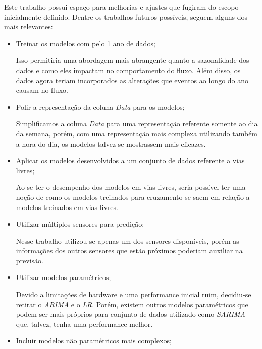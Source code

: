 Este trabalho possui espaço para melhorias e ajustes que fugiram do escopo inicialmente definido. Dentre os trabalhos futuros possíveis, seguem alguns dos mais relevantes:

\begin{itemize}
    \item Treinar os modelos com pelo 1 ano de dados;
    
    Isso permitiria uma abordagem mais abrangente quanto a sazonalidade dos dados e como eles impactam no comportamento do fluxo. Além disso, os dados agora teriam incorporados as alterações que eventos ao longo do ano causam no fluxo.
    
    \item Polir a representação da coluna  \textit{Data} para os modelos;
    
    Simplificamos a coluna \textit{Data} para uma representação referente somente ao dia da semana, porém, com uma representação mais complexa utilizando também a hora do dia, os modelos talvez se mostrassem mais eficazes.
    \item Aplicar os modelos desenvolvidos a um conjunto de dados referente a vias livres;
    
    Ao se ter o desempenho dos modelos em vias livres, seria possível ter uma noção de como os modelos treinados para cruzamento se saem em relação a modelos treinados em vias livres.
    
    \item Utilizar múltiplos sensores para predição;
    
    Nesse trabalho utilizou-se apenas um dos sensores disponíveis, porém as informações dos outros sensores que estão próximos poderiam auxiliar na previsão.
    
    \item Utilizar modelos paramétricos;
    
    Devido a limitações de hardware e uma performance inicial ruim, decidiu-se retirar o \textit{\acrfull{ARIMA}} e o \textit{\acrfull{LR}}. Porém, existem outros modelos paramétricos que podem ser mais próprios para conjunto de dados utilizado como \textit{\acrfull{SARIMA}} que, talvez, tenha uma performance melhor.
    
    \item Incluir modelos não paramétricos mais complexos;
    

\end{itemize}
